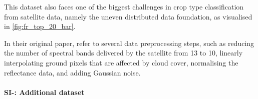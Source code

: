 This dataset also faces one of the biggest challenges in crop type classification from satellite data, namely the uneven distributed data foundation, as visualised in \cref{fig:fr_top_20_bar}.

In their original paper, \citeauthor{Garnot20:SIT} refer to several data preprocessing steps, such as 
reducing the number of spectral bands delivered by the \sentinel satellite from 13 to 10, 
linearly interpolating ground pixels that are affected by cloud cover, 
normalising the reflectance data, and 
adding Gaussian noise. 


\paragraph{SI-: Additional dataset}

